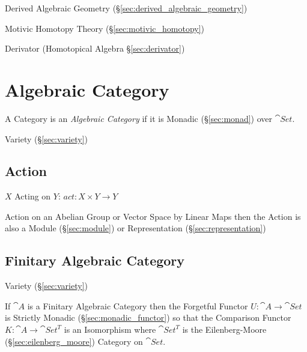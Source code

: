 Derived Algebraic Geometry (\S\ref{sec:derived_algebraic_geometry})

Motivic Homotopy Theory (\S\ref{sec:motivic_homotopy})

Derivator (Homotopical Algebra \S\ref{sec:derivator})



\section{Algebraic Category}\label{sec:algebraic_category}

A Category is an \emph{Algebraic Category} if it is Monadic (\S\ref{sec:monad})
over $\cat{Set}$.

Variety (\S\ref{sec:variety})



\subsection{Action}\label{sec:action}


$X$ Acting on $Y$: $act: X \times Y \rightarrow Y$

Action on an Abelian Group or Vector Space by Linear Maps then the
Action is also a Module (\S\ref{sec:module}) or Representation
(\S\ref{sec:representation})



\subsection{Finitary Algebraic Category}
\label{sec:finitary_algebraic_category}

Variety (\S\ref{sec:variety})

If $\cat{A}$ is a Finitary Algebraic Category then the Forgetful
Functor $U : \cat{A} \rightarrow \cat{Set}$ is Strictly Monadic
(\S\ref{sec:monadic_functor}) so that the Comparison Functor $K :
\cat{A} \rightarrow \cat{Set}^T$ is an Isomorphism where
$\cat{Set}^T$ is the Eilenberg-Moore (\S\ref{sec:eilenberg_moore})
Category on $\cat{Set}$.


